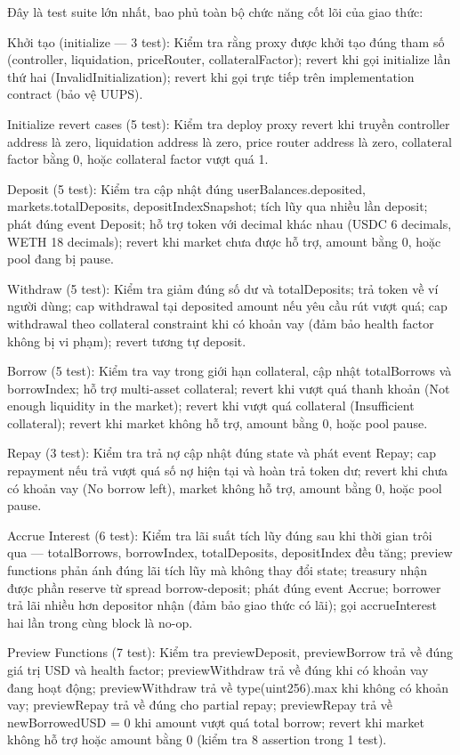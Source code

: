 \documentclass[../DoAn.tex]{subfiles}
\begin{document}
Đây là test suite lớn nhất, bao phủ toàn bộ chức năng cốt lõi của giao thức:

Khởi tạo (initialize --- 3 test): Kiểm tra rằng proxy được khởi tạo đúng tham số (controller, liquidation, priceRouter, collateralFactor); revert khi gọi initialize lần thứ hai (InvalidInitialization); revert khi gọi trực tiếp trên implementation contract (bảo vệ UUPS).

Initialize revert cases (5 test): Kiểm tra deploy proxy revert khi truyền controller address là zero, liquidation address là zero, price router address là zero, collateral factor bằng 0, hoặc collateral factor vượt quá 1.

Deposit (5 test): Kiểm tra cập nhật đúng userBalances.deposited, markets.totalDeposits, depositIndexSnapshot; tích lũy qua nhiều lần deposit; phát đúng event Deposit; hỗ trợ token với decimal khác nhau (USDC 6 decimals, WETH 18 decimals); revert khi market chưa được hỗ trợ, amount bằng 0, hoặc pool đang bị pause.

Withdraw (5 test): Kiểm tra giảm đúng số dư và totalDeposits; trả token về ví người dùng; cap withdrawal tại deposited amount nếu yêu cầu rút vượt quá; cap withdrawal theo collateral constraint khi có khoản vay (đảm bảo health factor không bị vi phạm); revert tương tự deposit.

Borrow (5 test): Kiểm tra vay trong giới hạn collateral, cập nhật totalBorrows và borrowIndex; hỗ trợ multi-asset collateral; revert khi vượt quá thanh khoản (Not enough liquidity in the market); revert khi vượt quá collateral (Insufficient collateral); revert khi market không hỗ trợ, amount bằng 0, hoặc pool pause.

Repay (3 test): Kiểm tra trả nợ cập nhật đúng state và phát event Repay; cap repayment nếu trả vượt quá số nợ hiện tại và hoàn trả token dư; revert khi chưa có khoản vay (No borrow left), market không hỗ trợ, amount bằng 0, hoặc pool pause.

Accrue Interest (6 test): Kiểm tra lãi suất tích lũy đúng sau khi thời gian trôi qua --- totalBorrows, borrowIndex, totalDeposits, depositIndex đều tăng; preview functions phản ánh đúng lãi tích lũy mà không thay đổi state; treasury nhận được phần reserve từ spread borrow-deposit; phát đúng event Accrue; borrower trả lãi nhiều hơn depositor nhận (đảm bảo giao thức có lãi); gọi accrueInterest hai lần trong cùng block là no-op.

Preview Functions (7 test): Kiểm tra previewDeposit, previewBorrow trả về đúng giá trị USD và health factor; previewWithdraw trả về đúng khi có khoản vay đang hoạt động; previewWithdraw trả về type(uint256).max khi không có khoản vay; previewRepay trả về đúng cho partial repay; previewRepay trả về newBorrowedUSD = 0 khi amount vượt quá total borrow; revert khi market không hỗ trợ hoặc amount bằng 0 (kiểm tra 8 assertion trong 1 test).
\end{document}
